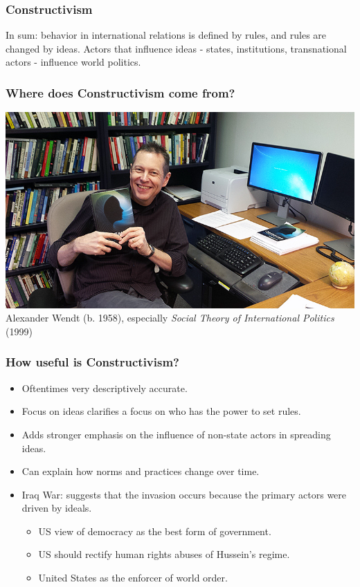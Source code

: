 \documentclass[handout]{beamer}
\begin{document}
\begin{frame} 
\frametitle{\LARGE{Constructivism}}
In sum: behavior in international relations is defined by rules, and rules are changed by ideas. Actors that  influence ideas - states, institutions, transnational actors - influence world politics. 

\end{frame}

\begin{frame} 
\frametitle{\LARGE{Where does Constructivism come from?}}
    \centering
\includegraphics[width=\textwidth,height=0.8\textheight,keepaspectratio]{wendt.jpg}
Alexander Wendt (b. 1958), especially \textit{Social Theory of International Politics} (1999)
\end{frame}

\begin{frame} 
\frametitle{\LARGE{How useful is Constructivism?}}
    \begin{itemize}
        \item Oftentimes very descriptively accurate.  \pause
        \item Focus on ideas clarifies a focus on who has the power to set rules. \pause
        \item Adds stronger emphasis on the influence of non-state actors in spreading ideas. \pause
        \item Can explain how norms and practices change over time.
        \item Iraq War: suggests that the invasion occurs because the primary actors were driven by ideals. \pause
        \begin{itemize}
            \item US view of democracy as the best form of government. \pause
            \item US should rectify human rights abuses of Hussein's regime. \pause
            \item United States as the enforcer of world order.
          \end{itemize}
      \end{itemize}
\end{frame}
\end{document}
